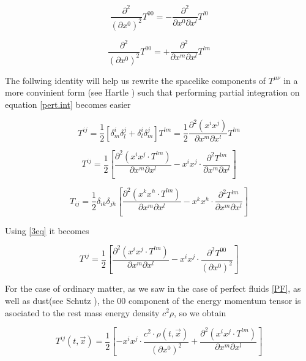 \begin{equation}
\frac{\partial^2}{({\partial x^0})^2} T^{0 0} = -\frac{\partial^2}{\partial x^0 \partial x^l } T^{l 0}
\end{equation}

\begin{equation}\label{3eq}
\frac{\partial^2}{({\partial x^0})^2} T^{0 0} = + \frac{\partial^2}{\partial x^m \partial x^l } T^{l m}
\end{equation}


The follwing identity will help us rewrite the spacelike components of $T^{\mu\nu}$  in a more convinient form (see Hartle \cite[chapter X]{Hartle:2021pel}) such that performing partial integration on equation \ref{pert.int} becomes easier 

\begin{equation}
T^{ij} = \frac{1}{2} [\delta^{i}_{m} \delta^{j}_{l} + \delta^{i}_{l} \delta^{j}_{m}] T^{lm} = \frac{1}{2} \frac{\partial^2(x^i x^j)}{\partial x^m \partial x^l} T^{lm}
\end{equation}


\begin{equation}
T^{ij} = \frac{1}{2} \left[  \frac{\partial^2(x^i x^j \cdot T^{lm})}{\partial x^m \partial x^l} - x^i x^j \cdot \frac{\partial^2 T^{lm} }{\partial x^m \partial x^l} \right]
\end{equation}


\begin{equation}\label{0eq}
T_{ij} = \frac{1}{2} \delta_{ik} \delta_{jh} \left[  \frac{\partial^2(x^k x^h \cdot T^{lm})}{\partial x^m \partial x^l} - x^k x^h \cdot \frac{\partial^2 T^{lm} }{\partial x^m \partial x^l} \right]
\end{equation}

Using \ref{3eq} it becomes


\begin{equation}\label{4eq}
T^{ij} = \frac{1}{2} \left[  \frac{\partial^2(x^i x^j \cdot T^{lm})}{\partial x^m \partial x^l} - x^i x^j \cdot \frac{\partial^2 T^{00} }{(\partial {x^0})^2} \right]
\end{equation}

For the case of ordinary matter, as we saw in the case of perfect fluids \ref{PF}, as well as dust(see Schutz \cite[chapter X]{Schutz:1985jx}), the $00$ component of the energy momentum tensor is asociated to the rest mass energy density $c^2 \rho$, so we obtain 

\begin{equation}\label{conoroinv}
T^{ij}(t, \vec{x}) = \frac{1}{2} \left[- x^i x^j \cdot \frac{c^2 \cdot \rho(t, \vec{x})}{(\partial {x^0})^2} + \frac{\partial^2(x^i x^j \cdot T^{lm})}{\partial x^m \partial x^l} \right]
\end{equation}


